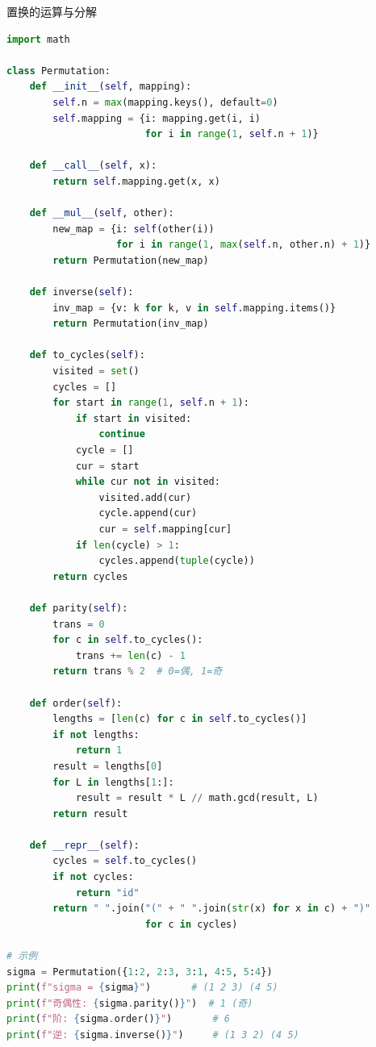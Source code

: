 \begin{mycode}{置换的运算与分解}
\begin{lstlisting}[language=Python]
import math

class Permutation:
    def __init__(self, mapping):
        self.n = max(mapping.keys(), default=0)
        self.mapping = {i: mapping.get(i, i)
                        for i in range(1, self.n + 1)}

    def __call__(self, x):
        return self.mapping.get(x, x)

    def __mul__(self, other):
        new_map = {i: self(other(i))
                   for i in range(1, max(self.n, other.n) + 1)}
        return Permutation(new_map)

    def inverse(self):
        inv_map = {v: k for k, v in self.mapping.items()}
        return Permutation(inv_map)

    def to_cycles(self):
        visited = set()
        cycles = []
        for start in range(1, self.n + 1):
            if start in visited:
                continue
            cycle = []
            cur = start
            while cur not in visited:
                visited.add(cur)
                cycle.append(cur)
                cur = self.mapping[cur]
            if len(cycle) > 1:
                cycles.append(tuple(cycle))
        return cycles

    def parity(self):
        trans = 0
        for c in self.to_cycles():
            trans += len(c) - 1
        return trans % 2  # 0=偶, 1=奇

    def order(self):
        lengths = [len(c) for c in self.to_cycles()]
        if not lengths:
            return 1
        result = lengths[0]
        for L in lengths[1:]:
            result = result * L // math.gcd(result, L)
        return result

    def __repr__(self):
        cycles = self.to_cycles()
        if not cycles:
            return "id"
        return " ".join("(" + " ".join(str(x) for x in c) + ")"
                        for c in cycles)

# 示例
sigma = Permutation({1:2, 2:3, 3:1, 4:5, 5:4})
print(f"sigma = {sigma}")       # (1 2 3) (4 5)
print(f"奇偶性: {sigma.parity()}")  # 1 (奇)
print(f"阶: {sigma.order()}")       # 6
print(f"逆: {sigma.inverse()}")     # (1 3 2) (4 5)
\end{lstlisting}
\end{mycode}

